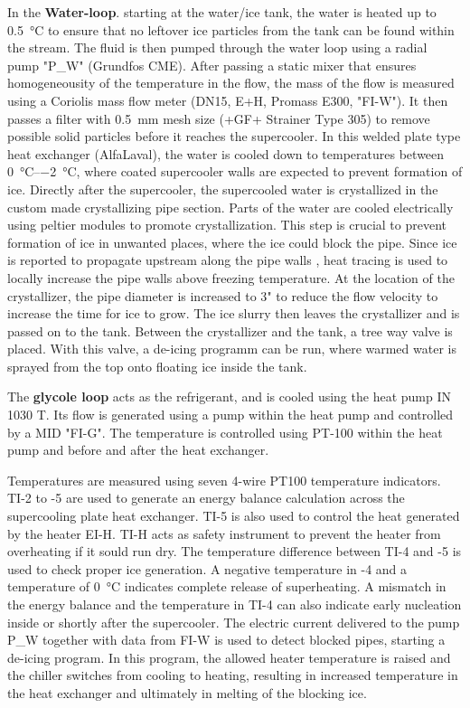 \documentclass[english]{SFOEYearlyReportEnglish_2018}
\begin{document}
In the \textbf{Water-loop}. starting at the water/ice tank, the water is heated up to \SI{0.5}{\celsius} to ensure that no leftover ice particles from the tank can be found within the stream. The fluid is then pumped through the water loop using a radial pump "P\_W" (Grundfos CME). After passing a static mixer that ensures homogeneousity of the temperature in the flow, the mass of the flow is measured using a Coriolis mass flow meter (DN15, E+H, Promass E300, "FI-W"). It then passes a filter with \SI{0.5}{mm} mesh size (+GF+ Strainer Type 305) to remove possible solid particles before it reaches the supercooler. In this welded plate type heat exchanger (AlfaLaval), the water is cooled down to temperatures between \SIrange{0}{-2}{\celsius}, where coated supercooler walls are expected to prevent formation of ice. Directly after the supercooler, the supercooled water is crystallized in the custom made crystallizing pipe section. Parts of the water are cooled electrically using peltier modules to promote crystallization. This step is crucial to prevent formation of ice in unwanted places, where the ice could block the pipe. Since ice is reported to propagate upstream along the pipe walls  \citep{mito_new_2002}, heat tracing is used to locally increase the pipe walls above freezing temperature. At the location of the crystallizer, the pipe diameter is increased to \si{3}{"} to reduce the flow velocity to increase the time for ice to grow. The ice slurry then leaves the crystallizer and is passed on to the tank. Between the crystallizer and the tank, a tree way valve is placed. With this valve, a de-icing programm can be run, where warmed water is sprayed from the top onto floating ice inside the tank.


The \textbf{glycole loop} acts as the refrigerant, and is cooled using the heat pump IN 1030 T. Its flow is generated using a pump within the heat pump and controlled by a MID "FI-G". The temperature is controlled using PT-100 within the  heat pump and before and after the heat exchanger.

Temperatures are measured using seven 4-wire PT100 temperature indicators. TI-2 to -5 are used to generate an energy balance calculation across the supercooling plate heat exchanger. TI-5 is also used to control the heat generated by the heater EI-H. TI-H acts as safety instrument to prevent the heater from overheating if it sould run dry. The temperature difference between TI-4 and -5 is used to check proper ice generation. A negative temperature in -4 and a temperature of \SI{0}{\celsius} indicates complete release of superheating. A mismatch in the energy balance and the temperature in TI-4 can also indicate early nucleation inside or shortly after the supercooler. The electric current delivered to the pump  P\_W together with data from FI-W is used to detect blocked pipes, starting a de-icing program. In this program, the allowed heater temperature is raised and the chiller switches from cooling to heating, resulting in increased temperature in the heat exchanger and ultimately in melting of the blocking ice.
\end{document}
